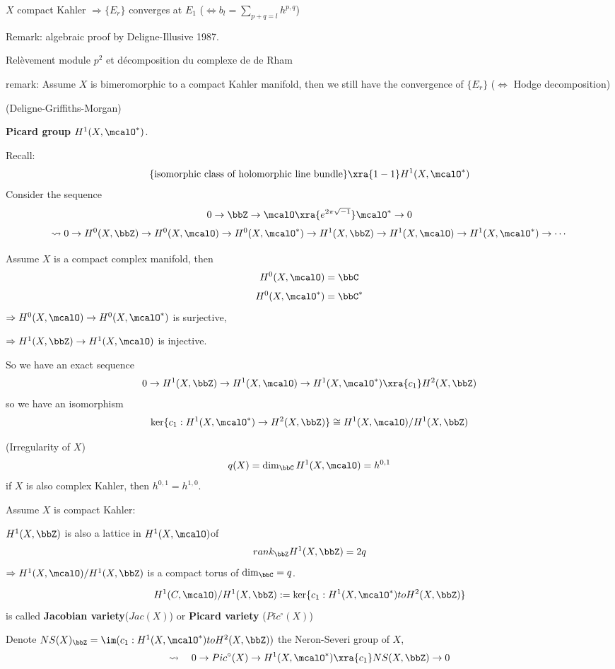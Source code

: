 \begin{thm} $X$ compact Kahler $\Rightarrow\{E_r\}$ converges at $E_1$
($\iff b_l=\sum\limits_{p+q=l}h^{p,q}$)
\end{thm}

Remark: algebraic proof by Deligne-Illusive 1987.

Rel\`{e}vement module $p^2$ et d\'{e}composition du complexe de de Rham

remark: Assume $X$ is bimeromorphic to a compact Kahler manifold,
then we still have the convergence of $\{E_r\}$
($\iff$ Hodge decomposition)

(Deligne-Griffiths-Morgan)

\textbf{Picard group $H^1(X,\mcalO^*)$}.

Recall:
$$\{\text{isomorphic class of holomorphic line bundle}\}
\xra{1-1} H^1(X,\mcalO^*)$$
Consider the sequence
$$0\to\bbZ\to\mcalO\xra{e^{2\pi\sqrt{-1}}}\mcalO^*\to 0$$
$$
  \rightsquigarrow
  0\to H^0(X,\bbZ)\to H^0(X,\mcalO)\to H^0(X,\mcalO^*)
  \to H^1(X,\bbZ)\to H^1(X,\mcalO)\to H^1(X,\mcalO^*)\to\cdots
$$

Assume $X$ is a compact complex manifold, then
$$H^0(X,\mcalO)=\bbC$$
$$H^0(X,\mcalO^*)=\bbC^*$$
$\Rightarrow H^0(X,\mcalO)\to H^0(X,\mcalO^*)$ is surjective,

$\Rightarrow H^1(X,\bbZ)\to H^1(X,\mcalO)$ is injective.

So we have an exact sequence
$$
  0\to H^1(X,\bbZ)\to H^1(X,\mcalO)
  \to H^1(X,\mcalO^*)\xra{c_1}H^2(X,\bbZ)
$$
so we have an isomorphism
$$\ker\{c_1:H^1(X,\mcalO^*)\to H^2(X,\bbZ)\}\cong H^1(X,\mcalO)/H^1(X,\bbZ)$$

\begin{definition}(Irregularity of $X$)
$$q(X)=\dim_{\bbC}H^1(X,\mcalO)
=h^{0,1}$$
if $X$ is also complex Kahler, then $h^{0,1}=h^{1,0}$.
\end{definition}

Assume $X$ is compact Kahler:

\begin{lemma}
$H^1(X,\bbZ)$ is also a lattice in $H^1(X,\mcalO)$of
$$rank_{\bbZ}H^1(X,\bbZ)=2q$$
$\Rightarrow H^1(X,\mcalO)/H^1(X,\bbZ)$ is a
compact torus of $\dim_{\bbC}=q$.
\end{lemma}
$$H^1(C,\mcalO)/H^1(X,\bbZ):=
\ker\{c_1:H^1(X,\mcalO^*)to H^2(X,\bbZ)\}$$
is called \textbf{Jacobian variety}($Jac(X)$) or \textbf{Picard variety}
($Pic^\circ(X)$)

Denote $NS(X)_{\bbZ}=\im(c_1:H^1(X,\mcalO^*)to H^2(X,\bbZ))$
the Neron-Severi group of $X$,
$$
  \rightsquigarrow\quad
  0\to Pic^\circ(X)\to H^1(X,\mcalO^*)\xra{c_1}NS(X,\bbZ)\to 0
$$


